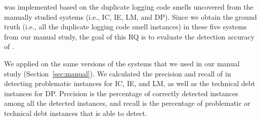 
\toolS was implemented based on the duplicate logging code smells uncovered from the manually studied systems (i.e., IC, IE, LM, and DP). Since we obtain the ground truth (i.e., all the duplicate logging code smell instances) in these five systems from our manual study, the goal of this RQ is to evaluate the detection accuracy of \tool.  

We applied \toolS on the same versions of the systems that we used in our manual study (Section~\ref{sec:manual}). We calculated the precision and recall of \toolS in detecting problematic instances for IC, IE, and LM, as well as the technical debt instances for DP. 
Precision is the percentage of correctly detected instances among all the detected instances, and recall is the percentage of problematic or technical debt instances that \toolS is able to detect.

